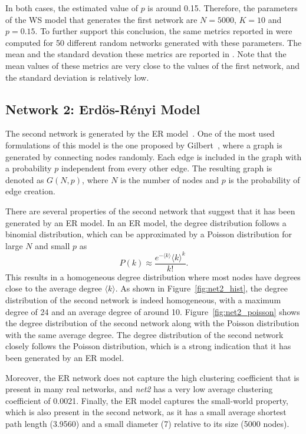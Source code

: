 \documentclass{article}
\begin{document}
In both cases, the estimated value of $p$ is around 0.15. Therefore, the parameters of the WS model that generates the first network are $N=5000$, $K=10$ and $p=0.15$. To further support this conclusion, the same metrics reported in  were computed for 50 different random networks generated with these parameters. The mean and the standard devation these metrics are reported in . Note that the mean values of these metrics are very close to the values of the first network, and the standard deviation is relatively low.


\subsection{Network 2: Erdös-Rényi Model}  %

The second network is generated by the ER model~\cite{erdds1959random}. One of the most used formulations of this model is the one proposed by Gilbert~\cite{gilbert1959random}, where a graph is generated by connecting nodes randomly. Each edge is included in the graph with a probability $p$ independent from every other edge. The resulting graph is denoted as $G(N, p)$, where $N$ is the number of nodes and $p$ is the probability of edge creation.

There are several properties of the second network that suggest that it has been generated by an ER model. In an ER model, the degree distribution follows a binomial distribution, which can be approximated by a Poisson distribution for large $N$ and small $p$ as
\begin{equation}
    P(k) \approx \frac{e^{-\langle k \rangle} \langle k \rangle^k}{k!}.
\end{equation}
This results in a homogeneous degree distribution where most nodes have degrees close to the average degree $\langle k \rangle$. As shown in Figure~\ref{fig:net2_hist}, the degree distribution of the second network is indeed homogeneous, with a maximum degree of 24 and an average degree of around 10. Figure~\ref{fig:net2_poisson} shows the degree distribution of the second network along with the Poisson distribution with the same average degree. The degree distribution of the second network closely follows the Poisson distribution, which is a strong indication that it has been generated by an ER model.

Moreover, the ER network does not capture the high clustering coefficient that is present in many real networks, and \textit{net2} has a very low average clustering coefficient of 0.0021. Finally, the ER model captures the small-world property, which is also present in the second network, as it has a small average shortest path length (3.9560) and a small diameter (7) relative to its size (5000 nodes).
\end{document}
